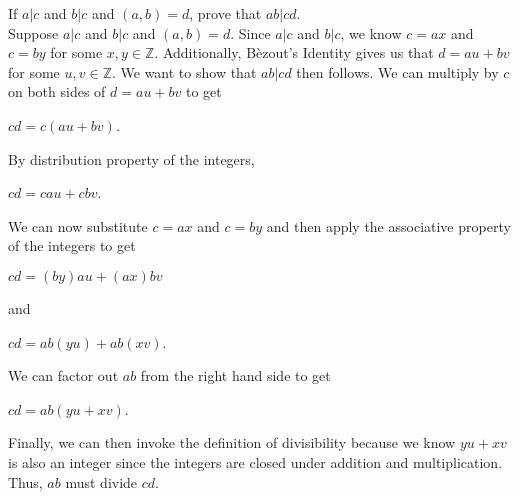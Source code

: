 \documentclass[12pt]{article}
\newcommand{\Z}{\mathbb{Z}}
\newenvironment{problem}[2][Problem]{\begin{trivlist}
\item[\hskip \labelsep {\bfseries #1}\hskip \labelsep {\bfseries #2.}]}{\end{trivlist}}
\begin{document}

\begin{problem}{6}
If $a|c$ and $b|c$ and $(a,b)=d$, prove that $ab|cd$. \\

\noindent
Suppose $a|c$ and $b|c$ and $(a,b)=d$. Since $a|c$ and $b|c$, we know $c=ax$ and $c=by$ for some $x,y \in \Z$. Additionally, B\`ezout's Identity gives us that $d=au+bv$ for some $u,v \in \Z$. We want to show that $ab|cd$ then follows. We can multiply by $c$ on both sides of $d=au+bv$ to get 

\begin{center}
$cd=c(au+bv)$.
\end{center} 

\noindent
By distribution property of the integers,

\begin{center}
$cd=cau+cbv$.
\end{center} 

\noindent
We can now substitute $c=ax$ and $c=by$ and then apply the associative property of the integers to get

\begin{center}
$cd=(by)au+(ax)bv$
\end{center} 

\noindent
and

\begin{center}
$cd=ab(yu)+ab(xv)$.
\end{center} 

\noindent
We can factor out $ab$ from the right hand side to get

\begin{center}
$cd=ab(yu+xv)$.
\end{center} 

\noindent
Finally, we can then invoke the definition of divisibility because we know $yu+xv$ is also an integer since the integers are closed under addition and multiplication. Thus, $ab$ must divide $cd$. \qedsymbol
\end{problem}
\end{document}
